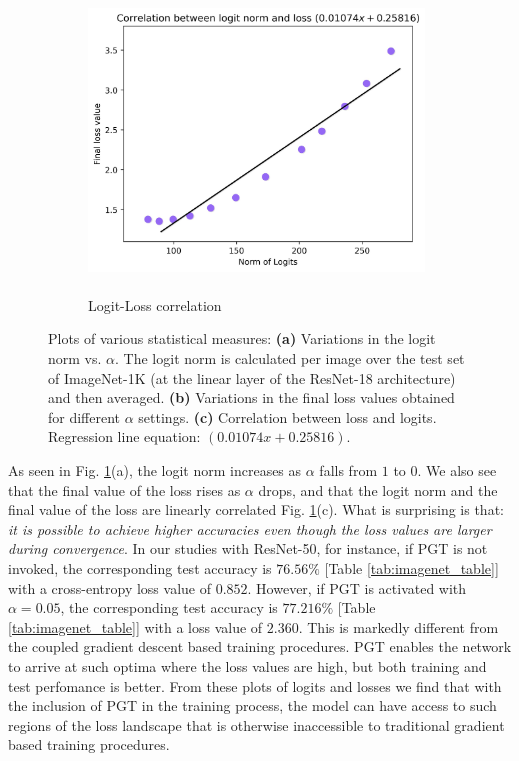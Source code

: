 \documentclass[runningheads]{llncs}
\begin{document}
\begin{figure}[!t]
\begin{subfigure}{0.33\textwidth}
\centering
\includegraphics[width=0.98\textwidth]{logit_vs_loss}
\caption{\\Logit-Loss correlation}
\end{subfigure}
\caption{ Plots of various statistical measures: \textbf{(a)} Variations in the logit
norm vs. $\alpha$. The logit norm is calculated per image over the test set of
ImageNet-1K (at the linear layer of the ResNet-18 architecture) and then averaged.
\textbf{(b)} Variations in the final loss values obtained for different $\alpha$
settings. \textbf{(c)} Correlation between loss and logits. Regression line equation:
$(0.01074 x + 0.25816)$. }
\label{fig:stats}
\vspace{-0.5cm}
\end{figure}





As seen in Fig. \ref{fig:stats}(a), the logit norm increases as $\alpha$ falls from $1$
to $0$. We also see that the final value of the loss rises as $\alpha$ drops, and that
the logit norm and the final value of the loss are linearly correlated Fig.
\ref{fig:stats}(c). What is surprising is that: \textit{it is possible to achieve higher
accuracies even though the loss values are larger during convergence}. In our studies
with ResNet-50, for instance, if PGT is not invoked, the corresponding test accuracy is
$76.56\%$ [Table \ref{tab:imagenet_table}] with a cross-entropy loss value of $0.852$.
However, if PGT is activated with $\alpha=0.05$, the corresponding test accuracy is
$77.216\%$ [Table \ref{tab:imagenet_table}] with a loss value of $2.360$. This is
markedly different from the coupled gradient descent based training procedures. PGT
enables the network to arrive at such optima where the loss values are high, but both
training and test perfomance is better. From these plots of logits and losses we find
that with the inclusion of PGT in the training process, the model can have access to
such regions of the loss landscape that is otherwise inaccessible to traditional
gradient based training procedures.
\end{document}
